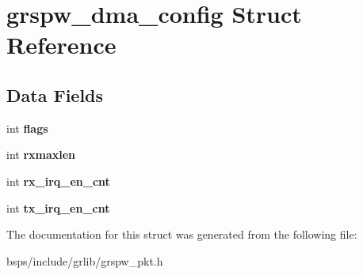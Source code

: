 \hypertarget{structgrspw__dma__config}{}\section{grspw\+\_\+dma\+\_\+config Struct Reference}
\label{structgrspw__dma__config}
\subsection*{Data Fields}
\begin{DoxyCompactItemize}
\item 
\mbox{\label{structgrspw__dma__config_aab5947b43c91e37d7740bf1e3e097ea7}} 
int {\bfseries flags}
\item 
\mbox{\label{structgrspw__dma__config_a332daf78b2837521a0616aa2a62e914a}} 
int {\bfseries rxmaxlen}
\item 
\mbox{\label{structgrspw__dma__config_a0254e0441289079215587867973636ab}} 
int {\bfseries rx\+\_\+irq\+\_\+en\+\_\+cnt}
\item 
\mbox{\label{structgrspw__dma__config_ae2902ad3148d9ad48ed1f02bfb916775}} 
int {\bfseries tx\+\_\+irq\+\_\+en\+\_\+cnt}
\end{DoxyCompactItemize}


The documentation for this struct was generated from the following file\+:\begin{DoxyCompactItemize}
\item 
bsps/include/grlib/grspw\+\_\+pkt.\+h\end{DoxyCompactItemize}
